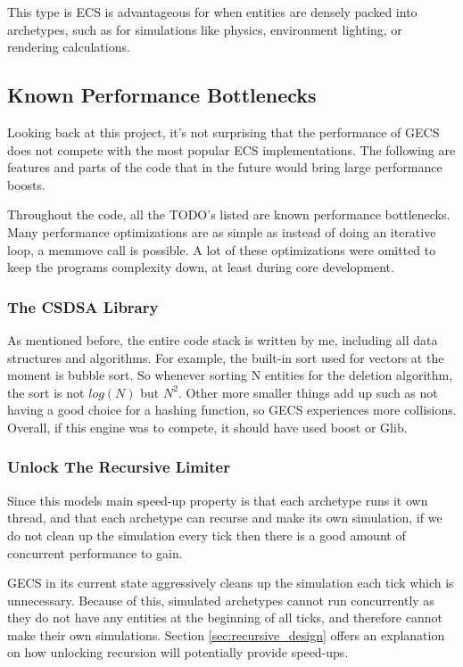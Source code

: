 This type is ECS is advantageous for when entities are densely packed into archetypes, such as for simulations like physics, environment lighting, or rendering calculations. 

\subsection{Known Performance Bottlenecks}
Looking back at this project, it's not surprising that the performance of GECS does not compete with the most popular ECS implementations. The following are features and parts of the code that in the future would bring large performance boosts. 

Throughout the code, all the TODO's listed are known performance bottlenecks. Many performance optimizations are as simple as instead of doing an iterative loop, a memmove call is possible. A lot of these optimizations were omitted to keep the programs complexity down, at least during core development.

\subsubsection{The CSDSA Library}
As mentioned before, the entire code stack is written by me, including all data structures and algorithms. For example, the built-in sort used for vectors at the moment is bubble sort. So whenever sorting N entities for the deletion algorithm, the sort is not $log(N)$ but $N^2$. Other more smaller things add up such as not having a good choice for a hashing function, so GECS experiences more collisions. Overall, if this engine was to compete, it should have used boost or Glib. 

\subsubsection{Unlock The Recursive Limiter}
Since this models main speed-up property is that each archetype runs it own thread, and that each archetype can recurse and make its own simulation, if we do not clean up the simulation every tick then there is a good amount of concurrent performance to gain.

GECS in its current state aggressively cleans up the simulation each tick which is unnecessary. Because of this, simulated archetypes cannot run concurrently as they do not have any entities at the beginning of all ticks, and therefore cannot make their own simulations. Section \ref{sec:recursive_design} offers an explanation on how unlocking recursion will potentially provide speed-ups.

